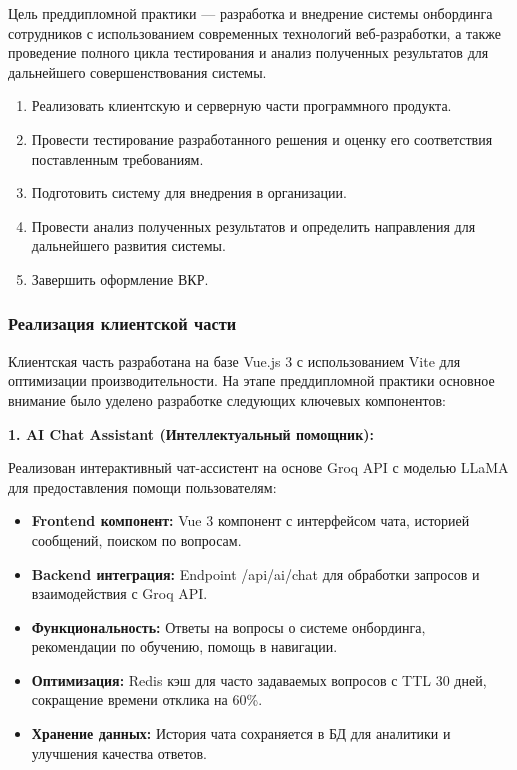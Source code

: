 
Цель преддипломной практики --- разработка и внедрение системы онбординга сотрудников с использованием современных технологий веб-разработки, а также проведение полного цикла тестирования и анализ полученных результатов для дальнейшего совершенствования системы.


\begin{enumerate}
	\item Реализовать клиентскую и серверную части программного продукта.
	\item Провести тестирование разработанного решения и оценку его соответствия поставленным требованиям.
	\item Подготовить систему для внедрения в организации.
	\item Провести анализ полученных результатов и определить направления для дальнейшего развития системы.
	\item Завершить оформление ВКР.
\end{enumerate}


\subsubsection*{Реализация клиентской части}

Клиентская часть разработана на базе Vue.js 3 с использованием Vite для оптимизации производительности. На этапе преддипломной практики основное внимание было уделено разработке следующих ключевых компонентов:

\textbf{1. AI Chat Assistant (Интеллектуальный помощник):}

Реализован интерактивный чат-ассистент на основе Groq API с моделью LLaMA для предоставления помощи пользователям:
\begin{itemize}
	\item \textbf{Frontend компонент:} Vue 3 компонент с интерфейсом чата, историей сообщений, поиском по вопросам.
	\item \textbf{Backend интеграция:} Endpoint /api/ai/chat для обработки запросов и взаимодействия с Groq API.
	\item \textbf{Функциональность:} Ответы на вопросы о системе онбординга, рекомендации по обучению, помощь в навигации.
	\item \textbf{Оптимизация:} Redis кэш для часто задаваемых вопросов с TTL 30 дней, сокращение времени отклика на 60\%.
	\item \textbf{Хранение данных:} История чата сохраняется в БД для аналитики и улучшения качества ответов.
\end{itemize}

